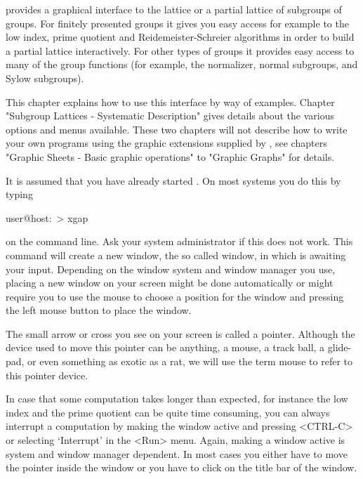 
{\XGAP} provides a graphical interface to the  lattice or a partial lattice
of subgroups of groups.  For finitely  presented groups it gives you easy
access for example to the low index, prime quotient and Reidemeister-Schreier
algorithms in order to build a partial  lattice interactively.  For other
types of groups  it provides easy access to  many of  the group functions
(for example, the normalizer, normal subgroups, and Sylow subgroups).

This chapter explains  how to use this  interface by way of examples.  
Chapter  "Subgroup  Lattices - Systematic  Description" gives
details about the   various  options and menus available.    These two
chapters  will not  describe how to  write  your own programs using the
graphic extensions supplied by {\XGAP}, see chapters "Graphic Sheets -
Basic graphic operations" to "Graphic Graphs" for details.

It is assumed that you have already started {\XGAP}.  On most systems you
do this by typing

\begintt 
user@host:~> xgap 
\endtt

on  the  command line.   Ask your  system administrator  if this does not
work.  This   command  will create   a new window,   the so called {\GAP}
window, in which {\GAP} is awaiting your input.   Depending on the window
system and window manager  you use, placing a new  window on your  screen
might be  done  automatically or might  require  you to use the  mouse to
choose a position for the  window and pressing the  left mouse button  to
place the window.

The small arrow   or cross you see on   your screen is  called a pointer.
Although the device used to move this pointer can be anything, a mouse, a
track ball, a glide-pad, or even something as exotic as a rat, we will use
the term mouse to refer to this pointer device.

In case that some computation takes longer than expected, for instance
the low index and the prime quotient can be quite time consuming, you
can always interrupt a computation by making the {\GAP} window active
and pressing <CTRL-C> or selecting `Interrupt' in the <Run> menu.
Again, making a window active is system and window manager dependent.
In most cases you either have to move the pointer inside the {\GAP}
window or you have to click on the title bar of the {\GAP} window.


